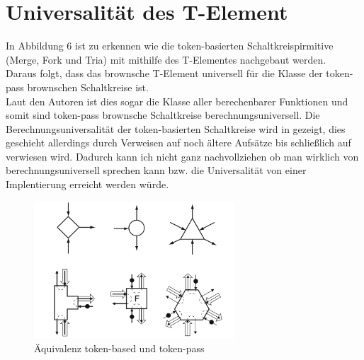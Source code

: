 \documentclass[11pt,a4paper]{article}
\begin{document}
\section{Universalität des T-Element}

In Abbildung 6 ist zu erkennen wie die token-basierten Schaltkreispirmitive 
(Merge, Fork und Tria) mit mithilfe des T-Elementes nachgebaut werden.
%
\\
Daraus folgt, dass das brownsche T-Element universell für die Klasse der 
token-pass brownschen Schaltkreise ist.
\\
%
Laut den Autoren ist dies sogar die Klasse aller berechenbarer Funktionen und
somit sind token-pass brownsche Schaltkreise berechnungsuniversell. 
%
Die Berechnungsuniversalität der token-basierten Schaltkreise wird in
\cite{Lee_2005} gezeigt, dies geschieht allerdings durch Verweisen auf 
noch ältere Aufsätze bis schließlich  auf \cite{Keller_1974} verwiesen wird.
%
Dadurch kann ich nicht ganz nachvollziehen ob man wirklich von
berechnungsuniversell sprechen kann bzw. die Universalität 
von einer Implentierung erreicht werden würde. 

\begin{figure}[h]
    \centering
    \includegraphics[width=7.5cm]{bilder/BasedToPass.png}
    \caption{Äquivalenz token-based und token-pass}
    \label{fig:BasedToPass}
\end{figure}


\end{document}
